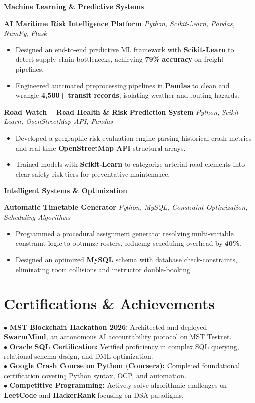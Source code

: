 \documentclass[a4paper,9.5pt]{article}
\begin{document}
\vspace{1.5pt}
\textbf{\large\color{accent}Machine Learning \& Predictive Systems}

\textbf{AI Maritime Risk Intelligence Platform} \hfill \textit{Python, Scikit-Learn, Pandas, NumPy, Flask}
\begin{itemize}
    \item Designed an end-to-end predictive ML framework with \textbf{Scikit-Learn} to detect supply chain bottlenecks, achieving \textbf{79\% accuracy} on freight pipelines.
    \item Engineered automated preprocessing pipelines in \textbf{Pandas} to clean and wrangle \textbf{4,500+ transit records}, isolating weather and routing hazards.
\end{itemize}

\textbf{Road Watch -- Road Health \& Risk Prediction System} \hfill \textit{Python, Scikit-Learn, OpenStreetMap API, Pandas}
\begin{itemize}
    \item Developed a geographic risk evaluation engine parsing historical crash metrics and real-time \textbf{OpenStreetMap API} structural arrays.
    \item Trained models with \textbf{Scikit-Learn} to categorize arterial road elements into clear safety risk tiers for preventative maintenance.
\end{itemize}

\vspace{1.5pt}
\textbf{\large\color{accent}Intelligent Systems \& Optimization}

\textbf{Automatic Timetable Generator} \hfill \textit{Python, MySQL, Constraint Optimization, Scheduling Algorithms}
\begin{itemize}
    \item Programmed a procedural assignment generator resolving multi-variable constraint logic to optimize rosters, reducing scheduling overhead by \textbf{40\%}.
    \item Designed an optimized \textbf{MySQL} schema with database check-constraints, eliminating room collisions and instructor double-booking.
\end{itemize}

\section{Certifications \& Achievements}
\small
$\bullet$ \textbf{MST Blockchain Hackathon 2026:} Architected and deployed \textbf{SwarmMind}, an autonomous AI accountability protocol on MST Testnet.\\
$\bullet$ \textbf{Oracle SQL Certification:} Verified proficiency in complex SQL querying, relational schema design, and DML optimization.\\
$\bullet$ \textbf{Google Crash Course on Python (Coursera):} Completed foundational certification covering Python syntax, OOP, and automation.\\
$\bullet$ \textbf{Competitive Programming:} Actively solve algorithmic challenges on \textbf{LeetCode} and \textbf{HackerRank} focusing on DSA paradigms.
\end{document}

